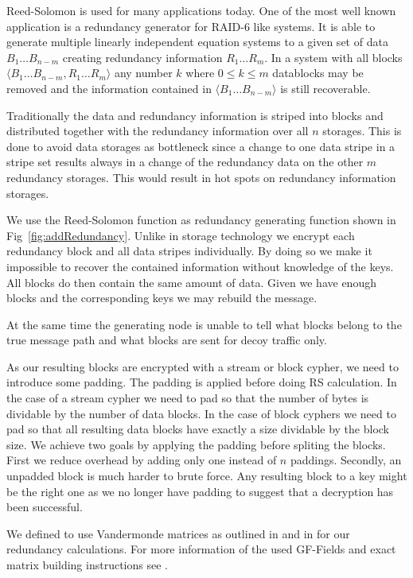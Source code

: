 \documentclass[9pt,journal,compsoc]{IEEEtran}
\begin{document}
Reed-Solomon is used for many applications today. One of the most well known application is a redundancy generator for RAID-6 like systems. It is able to generate multiple linearly independent equation systems to a given set of data $B_1\ldots B_{n-m}$ creating redundancy information $R_1\ldots R_m$. In a system with all blocks $\langle B_1\ldots B_{n-m}, R_1\ldots R_m \rangle$ any number $k$ where $0\le k\le m$ datablocks may be removed and the information contained in $\langle B_1\ldots B_{n-m}\rangle$ is still recoverable. 

Traditionally the data and redundancy information is striped into blocks and distributed together with the redundancy information over all $n$ storages. This is done to avoid data storages as bottleneck since a change to one data stripe  in a stripe set results always in a change of the redundancy data on the other $m$ redundancy storages. This would result in hot spots on redundancy information storages.

We use the Reed-Solomon function as redundancy generating function shown in Fig~\ref{fig:addRedundancy}. Unlike in storage technology we encrypt each redundancy block and all data stripes individually. By doing so we make it impossible to recover the contained information without knowledge of the keys. All blocks do then contain the same amount of data. Given we have enough blocks and the corresponding keys we may rebuild the message. 

At the same time the generating node is unable to tell what blocks belong to the true message path and what blocks are sent for decoy traffic only. 

As our resulting blocks are encrypted with a stream or block cypher, we need to introduce some padding. The padding is applied before doing RS calculation. In the case of a stream cypher we need to pad so that the number of bytes is dividable by the number of data blocks. In the case of block cyphers we need to pad so that all resulting data blocks have exactly a size dividable by the block size. We achieve two goals by applying the padding before spliting the blocks. First we reduce overhead by adding only one instead of $n$ paddings. Secondly, an unpadded block is much harder to brute force. Any resulting block to a key might be the right one as we no longer have padding to suggest that a decryption has been successful.

We defined to use Vandermonde matrices as outlined in \cite{pd:96:rs} and in \cite{pd:03:rs} for our redundancy calculations. For more information of the used GF-Fields and exact matrix building instructions see \cite{messageVortex}.
\end{document}
